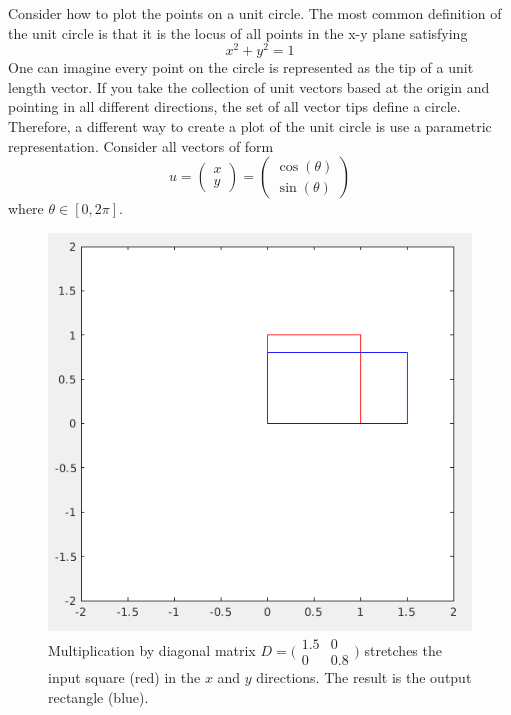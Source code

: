 \documentclass[onefignum,onetabnum]{siamart190516}
\begin{document}
Consider how to plot the points on a unit circle.  
The most common definition of the unit circle is 
that it is the locus of all points in the x-y
plane satisfying
\begin{equation}
x^2 + y^2 = 1
\label{eq:unit_ball}
\end{equation}
One can imagine every point on the circle is represented as the tip
of a unit length vector.  If you take the collection of unit vectors
based at the origin and pointing in all different directions, 
the set of all vector tips 
define a circle.  Therefore, a different way to 
create a plot of the unit circle is use a parametric
representation.  Consider all vectors of form
\begin{equation}
u = 
\begin{pmatrix}
x \\
y 
\end{pmatrix}
=
\begin{pmatrix}
\cos(\theta) \\
\sin(\theta) 
\end{pmatrix}
\label{eq:parametriccircle}
\end{equation}
where $\theta \in [0, 2\pi]$.  

\begin{figure}[thb]
	\centering
	\includegraphics[width=0.7\columnwidth]{StretchASquare.png}
	\caption{Multiplication by diagonal matrix 
	$D = \bigl( \begin{smallmatrix} 1.5 & 0 \\ 0 & 0.8\end{smallmatrix}\bigr)$
	stretches the input square (red) in the $x$ and $y$ directions. The
	result is the output rectangle (blue).}
	\label{fig:StretchASquare}
\end{figure}
\FloatBarrier
\end{document}
